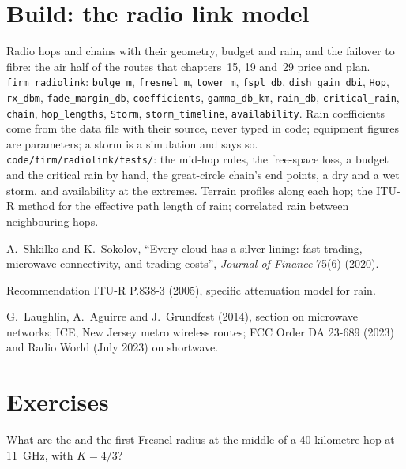 \section{Build: the radio link model}\label{bld:nw:long-haul-wireless:radiolink}

\begin{build}
 Radio hops and chains with their geometry, budget and rain, and the failover to fibre: the air half of the routes that
chapters~15, 19 and~29 price and plan.
 \texttt{firm\_radiolink}: \texttt{bulge\_m}, \texttt{fresnel\_m}, \texttt{tower\_m}, \texttt{fspl\_db}, \texttt{dish\_gain\_dbi},
\texttt{Hop}, \texttt{rx\_dbm}, \texttt{fade\_margin\_db}, \texttt{coefficients}, \texttt{gamma\_db\_km}, \texttt{rain\_db}, \texttt{critical\_rain},
\texttt{chain}, \texttt{hop\_lengths}, \texttt{Storm}, \texttt{storm\_timeline}, \texttt{availability}.
 Rain coefficients come from the data file with their source, never typed in code; equipment figures are parameters; a storm is a
simulation and says so.
 \texttt{code/firm/radiolink/tests/}: the mid-hop rules, the free-space loss, a budget and the critical rain by hand, the
great-circle chain's end points, a dry and a wet storm, and availability at the extremes.
 Terrain profiles along each hop; the ITU-R method for the effective path length of rain; correlated rain between neighbouring
hops.
\end{build}

\begin{omsources}
\item A.~Shkilko and K.~Sokolov, ``Every cloud has a silver lining: fast trading, microwave connectivity, and trading costs'', \emph{Journal of
Finance} 75(6) (2020).
\item Recommendation ITU-R P.838-3 (2005), specific attenuation model for rain.
\item G.~Laughlin, A.~Aguirre and J.~Grundfest (2014), section on microwave networks; ICE, New Jersey metro wireless routes; FCC Order DA 23-689
(2023) and Radio World (July 2023) on shortwave.
\end{omsources}

\section{Exercises}

\begin{exercise}[$\star$]\label{exo:nw:long-haul-wireless:1}
What are the  and the first Fresnel radius at the middle of a 40-kilometre hop at \qty{11}{\giga\hertz}, with $K = 4/3$?
\end{exercise}

